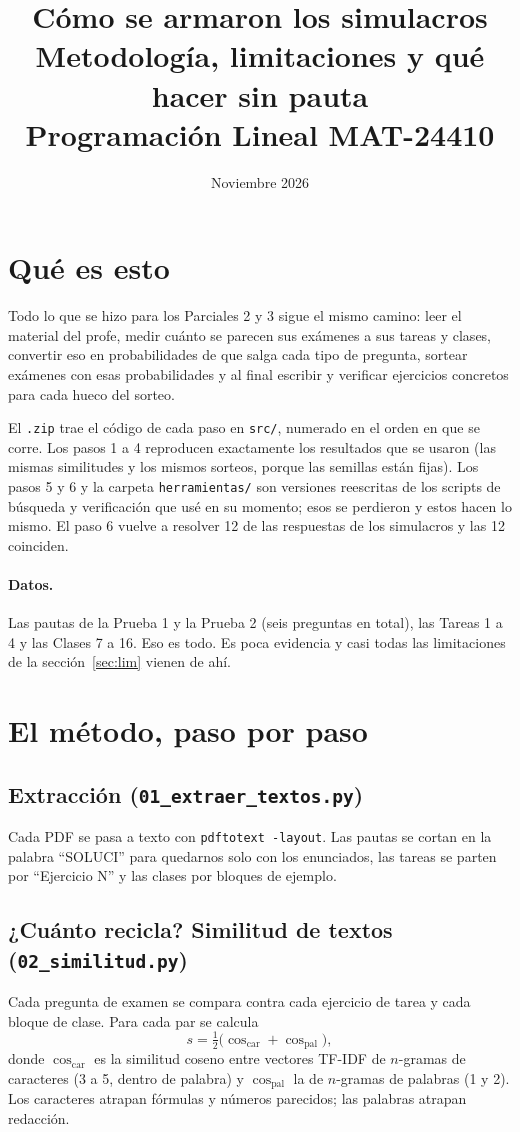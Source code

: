 \documentclass[11pt]{article}
\title{Cómo se armaron los simulacros\\[2pt]\large Metodología, limitaciones y qué hacer sin pauta\\[2pt]\normalsize Programación Lineal MAT-24410}
\date{Noviembre 2026}
\author{}
\newcommand{\cod}[1]{\texttt{#1}}
\begin{document}
\maketitle

\section{Qué es esto}

Todo lo que se hizo para los Parciales 2 y 3 sigue el mismo camino: leer el material del
profe, medir cuánto se parecen sus exámenes a sus tareas y clases, convertir eso en
probabilidades de que salga cada tipo de pregunta, sortear exámenes con esas probabilidades y
al final escribir y verificar ejercicios concretos para cada hueco del sorteo.

El \cod{.zip} trae el código de cada paso en \cod{src/}, numerado en el orden en que se
corre. Los pasos 1 a 4 reproducen exactamente los resultados que se usaron (las mismas
similitudes y los mismos sorteos, porque las semillas están fijas). Los pasos 5 y 6 y la
carpeta \cod{herramientas/} son versiones reescritas de los scripts de búsqueda y
verificación que usé en su momento; esos se perdieron y estos hacen lo mismo. El paso 6
vuelve a resolver 12 de las respuestas de los simulacros y las 12 coinciden.

\paragraph{Datos.} Las pautas de la Prueba 1 y la Prueba 2 (seis preguntas en total), las
Tareas 1 a 4 y las Clases 7 a 16. Eso es todo. Es poca evidencia y casi todas las
limitaciones de la sección~\ref{sec:lim} vienen de ahí.

\section{El método, paso por paso}

\subsection{Extracción (\cod{01\_extraer\_textos.py})}
Cada PDF se pasa a texto con \cod{pdftotext -layout}. Las pautas se cortan en la palabra
``SOLUCI'' para quedarnos solo con los enunciados, las tareas se parten por ``Ejercicio N'' y
las clases por bloques de ejemplo.

\subsection{¿Cuánto recicla? Similitud de textos (\cod{02\_similitud.py})}
Cada pregunta de examen se compara contra cada ejercicio de tarea y cada bloque de clase. Para
cada par se calcula
\[
s = \tfrac12\big(\cos_{\text{car}} + \cos_{\text{pal}}\big),
\]
donde $\cos_{\text{car}}$ es la similitud coseno entre vectores TF-IDF de $n$-gramas de
caracteres (3 a 5, dentro de palabra) y $\cos_{\text{pal}}$ la de $n$-gramas de palabras (1 y
2). Los caracteres atrapan fórmulas y números parecidos; las palabras atrapan redacción.
\end{document}
